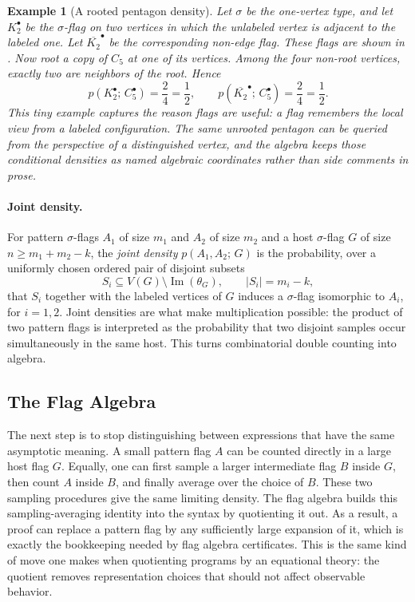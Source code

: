 \documentclass{article}
\newtheorem{example}[theorem]{Example}
\newcommand{\den}[2]{p(#1;\,#2)}
\begin{document}
\begin{example}[A rooted pentagon density]
  Let $\sigma$ be the one-vertex type, and let $K_2^\bullet$ be the
  $\sigma$-flag on two vertices in which the unlabeled vertex is adjacent to
  the labeled one.  Let $\overline{K_2}^{\bullet}$ be the corresponding
  non-edge flag.  These flags are shown in .  Now root
  a copy of $C_5$ at one of its vertices.  Among the
  four non-root vertices, exactly two are neighbors of the root.  Hence
  \[
    \den{K_2^\bullet}{C_5^\bullet} = \frac{2}{4} = \frac12,
    \qquad
    \den{\overline{K_2}^{\bullet}}{C_5^\bullet} = \frac{2}{4} = \frac12.
  \]
  This tiny example captures the reason flags are useful: a flag remembers
  the local view from a labeled configuration.  The same unrooted pentagon can
  be queried from the perspective of a distinguished vertex, and the algebra
  keeps those conditional densities as named algebraic coordinates rather than
  side comments in prose.
\end{example}

\paragraph{Joint density.}
For pattern $\sigma$-flags $A_1$ of size $m_1$ and $A_2$ of size $m_2$ and a host
$\sigma$-flag $G$ of size $n \geq m_1 + m_2 - k$, the \emph{joint density}
$\den{A_1,A_2}{G}$ is the probability, over a uniformly chosen ordered pair
of disjoint subsets
\[
  S_i \subseteq V(G)\setminus \operatorname{Im}(\theta_G),
  \qquad |S_i|=m_i-k,
\]
that $S_i$ together with the labeled vertices of $G$ induces a
$\sigma$-flag isomorphic to $A_i$, for $i=1,2$.
Joint densities are what make multiplication possible: the product of two
pattern flags is interpreted as the probability that two disjoint samples occur
simultaneously in the same host.  This turns combinatorial double counting
into algebra.

\subsection{The Flag Algebra}

The next step is to stop distinguishing between expressions that have the same
asymptotic meaning.  A small pattern flag $A$ can be counted directly in a
large host flag $G$.  Equally, one can first sample a larger intermediate flag
$B$ inside $G$, then count $A$ inside $B$, and finally average over the choice
of $B$.
These two sampling procedures give the same limiting density.  The flag
algebra builds this sampling-averaging identity into the syntax by quotienting
it out.  As a result, a proof can replace a pattern flag by any sufficiently
large expansion of it, which is exactly the bookkeeping needed by flag algebra
certificates.  This is the same kind of move one makes when quotienting
programs by an equational theory: the quotient removes representation choices
that should not affect observable behavior.
\end{document}
